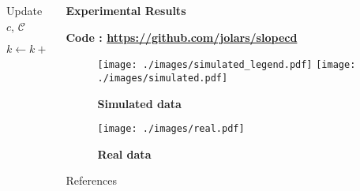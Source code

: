 \documentclass[english,final,t]{beamer}
\begin{document}
\begin{frame}{}
\begin{columns}[t]
\begin{column}{.3\linewidth}
\begin{block}{\textbf{\color{malgared}{\#3 Algorithm}}}
\begin{algorithm}[H]
{{{				  Update \(c\), \(\mathcal{C}\)

				  \(k \gets k + 1\)
				}
			  }
			}
			\Return{\(\beta\)}
		  \end{algorithm}

		\end{block}
	\end{column}
	\begin{column}{.3\linewidth}
		\begin{block}{\textbf{\color{malgared}Experimental Results}}
			\begin{center}
					\begin{minipage}{0.9\linewidth}
					\begin{beamerboxesrounded}[lower=headerCol]{}
						\textbf{Code : \url{https://github.com/jolars/slopecd}}
					\end{beamerboxesrounded}
				\end{minipage}
			\end{center}
			\begin{figure}[tb]
				\texttt{[image: ./images/simulated\_legend.pdf]}
				\texttt{[image: ./images/simulated.pdf]}

				\textbf{Simulated data}
			\end{figure}
			\vspace{.5em}

			\begin{figure}[tb]
				\texttt{[image: ./images/real.pdf]}

				\textbf{Real data}
			\end{figure}

			References
			\nocite{*}
			\normalsize
	\end{block}


	\end{column}
\end{columns}
\end{frame}
\end{document}
